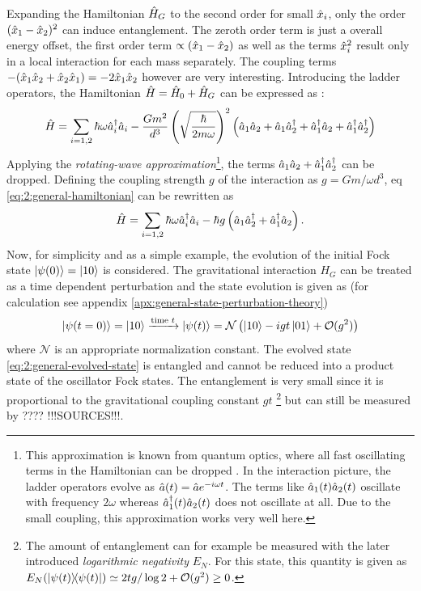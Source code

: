 Expanding the Hamiltonian $\hat{H}_G$ to the second order for small $\hat{x}_i$, only the order $(\hat{x}_1 - \hat{x}_2)^2$ can induce entanglement. The zeroth order term is just a overall energy offset, the first order term $\propto (\hat{x}_1 - \hat{x}_2)$ as well as the terms $\hat{x}^2_i$ result only in a local interaction for each mass separately. The coupling terms $ - (\hat{x}_1\hat{x}_2 + \hat{x}_2\hat{x}_1) = -2\hat{x}_1\hat{x}_2$ however are very interesting.
Introducing the ladder operators, the Hamiltonian $\hat{H}=\hat{H}_0 + \hat{H}_G$ can be expressed as \cite{Carney_2018}:
\begin{equation}\label{eq:2:general-hamiltonian}
  \hat{H} = \sum_{i=1,2} \hbar \omega \hat{a}_i^\dagger \hat{a}_i - \frac{Gm^2}{d^3} \left(\sqrt{\frac{\hbar}{2m\omega}}\right)^2 \left( \hat{a}_1\hat{a}_2 + \hat{a}_1\hat{a}^\dagger_2 + \hat{a}^\dagger_1\hat{a}_2 + \hat{a}^\dagger_1\hat{a}^\dagger_2 \right)
\end{equation}
Applying the \textit{rotating-wave approximation}\footnote{This approximation is known from quantum optics, where all fast oscillating terms in the Hamiltonian can be dropped \cite{Carney_2018,Lami_2024}. In the interaction picture, the ladder operators evolve as $\hat{a}(t) = \hat{a}e^{-i\omega t}$. The terms like $\hat{a}_1(t)\hat{a}_2(t)$ oscillate with frequency $2\omega$ whereas $\hat{a}_1^\dagger(t) \hat{a}_2(t)$ does not oscillate at all. Due to the small coupling, this approximation works very well here.}, the terms $\hat{a}_1\hat{a}_2 + \hat{a}^\dagger_1\hat{a}^\dagger_2$ can be dropped. Defining the coupling strength $g$ of the interaction as $g = Gm/\omega d^3$, eq \eqref{eq:2:general-hamiltonian} can be rewritten as
\begin{equation}
  \hat{H} = \sum_{i=1,2} \hbar \omega \hat{a}_i^\dagger \hat{a}_i - \hbar g \left( \hat{a}_1\hat{a}^\dagger_2 + \hat{a}^\dagger_1\hat{a}_2 \right) .
\end{equation}
Now, for simplicity and as a simple example, the evolution of the initial Fock state $\ket{\psi(0)} = \ket{10}$ is considered. The gravitational interaction $H_G$ can be treated as a time dependent perturbation and the state evolution is given as (for calculation see appendix \ref{apx:general-state-perturbation-theory}) \cite{Carney_2018}
\begin{equation} \label{eq:2:general-evolved-state}
  \ket{\psi(t = 0)} = \ket{10} \xrightarrow{\text{time }t} \ket{\psi(t)} =  \mathcal{N} \left(\ket{10} - i g t \ket{01} + \mathcal{O}(g^2) \right)
\end{equation}
where $\mathcal{N}$ is an appropriate normalization constant. The evolved state \eqref{eq:2:general-evolved-state} is entangled and cannot be reduced into a product state of the oscillator Fock states. The entanglement is very small since it is proportional to the gravitational coupling constant $gt$ \footnote{The amount of entanglement can for example be measured with the later introduced \textit{logarithmic negativity} $E_N$. For this state, this quantity is given as $E_N(\ketbra{\psi(t)}) \simeq 2tg/\log 2 + \mathcal{O}(g^2) \geq 0$.} but can still be measured by ???? !!!SOURCES!!!.
